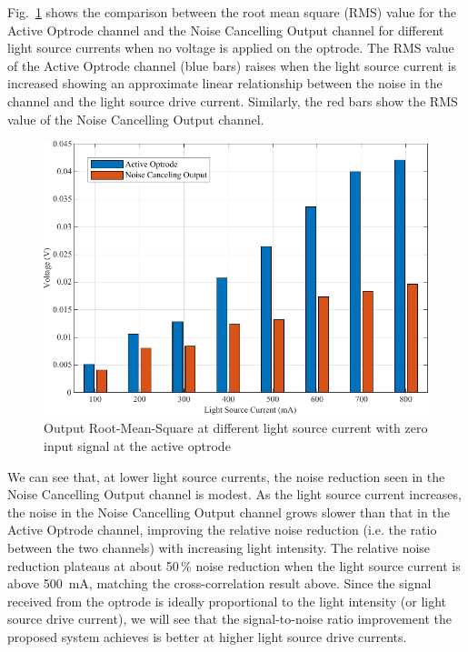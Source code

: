 Fig.~\ref{fig_RMS value for ch1 and DSP output} shows the comparison between the root mean square (RMS) value for the Active Optrode channel and the Noise Cancelling Output channel for different light source currents when no voltage is applied on the optrode.  The RMS value of the Active Optrode channel (blue bars) raises when the light source current is increased showing an approximate linear relationship between the noise in the channel and the light source drive current. Similarly, the red bars show the RMS value of the Noise Cancelling Output channel. 

\begin{figure}[h]
\centerline{\includegraphics[scale=1]{5-Experiment/RMS value for ch1 and DSP output.pdf}}
\caption{Output Root-Mean-Square at different light source current with zero input signal at the active optrode}
\label{fig_RMS value for ch1 and DSP output}
\end{figure}

We can see that, at lower light source currents, the noise reduction seen in the Noise Cancelling Output channel is modest.  As the light source current increases, the noise in the Noise Cancelling Output channel grows slower than that in the Active Optrode channel, improving the relative noise reduction (i.e. the ratio between the two channels) with increasing light intensity.  The relative noise reduction plateaus at about 50\,\% noise reduction when the light source current is above \qty{500}{mA}, matching the cross-correlation result above.  Since the signal received from the optrode is ideally proportional to the light intensity (or light source drive current), we will see that the signal-to-noise ratio improvement the proposed system achieves is better at higher light source drive currents. 

